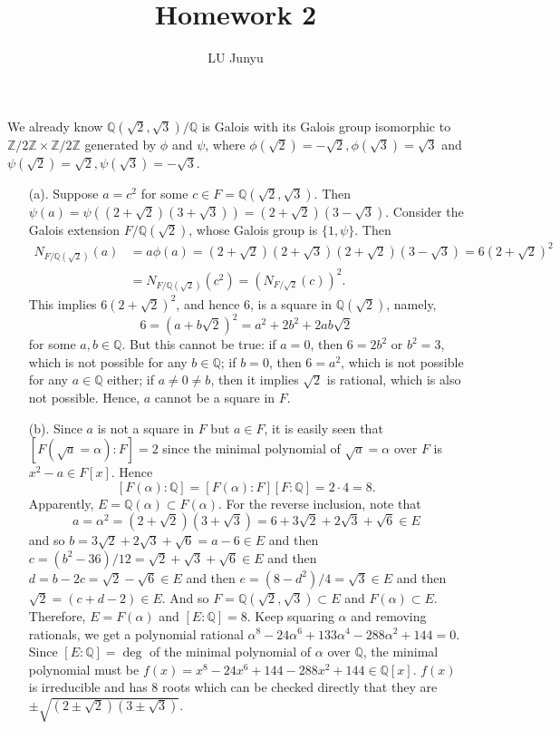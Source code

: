 \documentclass[12pt,reqno]{article}
\theoremstyle{definition}
\newcommand{\qq}{\mathbb{Q}}
\newcommand{\zz}{\mathbb{Z}}
\begin{document}
\title{Homework 2}
\author{LU Junyu}

\begin{solution}{1}
	We already know $\qq(\sqrt{2},\sqrt{3})/\qq$ is Galois with its Galois group isomorphic to $\zz/2\zz\times \zz/2\zz$ generated by $\phi$ and $\psi$, where $\phi(\sqrt{2})=-\sqrt{2},\phi(\sqrt{3})=\sqrt{3}$ and $\psi(\sqrt{2})=\sqrt{2}, \psi(\sqrt{3})=-\sqrt{3}$.

	\begin{enumerate}
		\item[(a).] Suppose $a=c^2$ for some $c\in F=\qq(\sqrt{2},\sqrt{3})$. Then $\psi(a)=\psi((2+\sqrt{2})(3+\sqrt{3}))=(2+\sqrt{2})(3-\sqrt{3})$. Consider the Galois extension $F/\qq(\sqrt{2})$, whose Galois group is $\{1,\psi\}$. Then
		      \begin{align*}
			      N_{F/\qq(\sqrt{2})}(a) & =a\phi(a)=(2+\sqrt{2})(2+\sqrt{3})(2+\sqrt{2})(3-\sqrt{3})=6(2+\sqrt{2})^2 \\
			                             & =N_{F/\qq(\sqrt{2})}(c^2)=(N_{F/\sqrt{2}}(c))^2.
		      \end{align*}
		      This implies $6(2+\sqrt{2})^2$, and hence 6, is a square in $\qq(\sqrt{2})$, namely,
		      $$6=(a+b\sqrt{2})^2=a^2+2b^2+2ab\sqrt{2}$$ for some $a,b\in \qq$. But this cannot be true: if $a=0$, then $6=2b^2$ or $b^2=3$, which is not possible for any $b\in \qq$; if $b=0$, then $6=a^2$, which is not possible for any $a\in \qq$ either; if $a\not=0\not=b$, then it implies $\sqrt{2}$ is rational, which is also not possible. Hence, $a$ cannot be a square in $F$.
		\item[(b).] Since $a$ is not a square in $F$ but $a\in F$, it is easily seen that $[F(\sqrt{a}=\alpha):F]=2$ since the minimal polynomial of $\sqrt{a}=\alpha$ over $F$ is $x^2-a\in F[x]$. Hence $$[F(\alpha):\qq]=[F(\alpha):F][F:\qq]=2\cdot 4=8.$$
		      Apparently, $E=\qq(\alpha)\subset F(\alpha)$. For the reverse inclusion, note that $$a=\alpha^2=(2+\sqrt{2})(3+\sqrt{3})=6+3\sqrt{2}+2\sqrt{3}+\sqrt{6}\in E$$
		      and so $b=3\sqrt{2}+2\sqrt{3}+\sqrt{6} = a-6\in E$ and then
		      $c=(b^2-36)/12=\sqrt{2}+\sqrt{3}+\sqrt{6}\in E$
		      and then $d=b-2c=\sqrt{2}-\sqrt{6}\in E$ and then $e = (8-d^2)/4=\sqrt{3} \in E $ and then $\sqrt{2}=(c+d-2)\in E$. And so $F=\qq(\sqrt{2},\sqrt{3})\subset E$ and $F(\alpha)\subset E$. Therefore, $E=F(\alpha)$ and $[E:\qq]=8$. Keep squaring $\alpha$ and removing rationals, we get a polynomial rational $\alpha^8-24\alpha^6+133\alpha^4-288\alpha^2+144=0$. Since $[E:\qq]=\deg$ of the minimal polynomial of $\alpha$ over $\qq$, the minimal polynomial must be $f(x)=x^8-24x^6+144-288x^2+144\in \qq[x]$. $f(x)$ is irreducible and has 8 roots which can be checked directly that they are $\pm\sqrt{(2\pm\sqrt{2})(3\pm\sqrt{3})}$.

\end{enumerate}
\end{solution}
\end{document}
